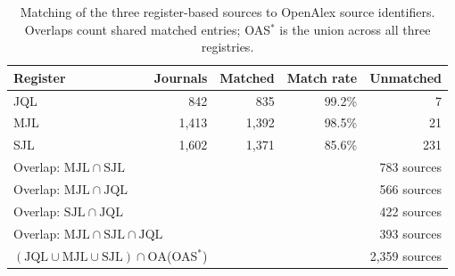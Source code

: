 \begin{table}[htbp]
\centering
\caption{Matching of the three register-based sources to OpenAlex source identifiers. Overlaps count shared matched entries; OAS$^*$ is the union across all three registries.}
\label{tab:source_matching}
\begin{tabular}{lrrrr}
\toprule
Register & Journals & Matched & Match rate & Unmatched \\
\midrule
JQL & 842 & 835 & 99.2\% & 7 \\
MJL & 1,413 & 1,392 & 98.5\% & 21 \\
SJL & 1,602 & 1,371 & 85.6\% & 231 \\
\midrule
\multicolumn{2}{l}{Overlap: $\mathrm{MJL} \cap \mathrm{SJL}$} & \multicolumn{3}{r}{783 sources} \\
\multicolumn{2}{l}{Overlap: $\mathrm{MJL} \cap \mathrm{JQL}$} & \multicolumn{3}{r}{566 sources} \\
\multicolumn{2}{l}{Overlap: $\mathrm{SJL} \cap \mathrm{JQL}$} & \multicolumn{3}{r}{422 sources} \\
\multicolumn{2}{l}{Overlap: $\mathrm{MJL} \cap \mathrm{SJL} \cap \mathrm{JQL}$} & \multicolumn{3}{r}{393 sources} \\
\multicolumn{2}{l}{$(\mathrm{JQL} \cup \mathrm{MJL} \cup \mathrm{SJL}) \cap \mathrm{OA}$\quad (OAS$^*$)} & \multicolumn{3}{r}{2,359 sources} \\
\bottomrule
\end{tabular}
\end{table}
